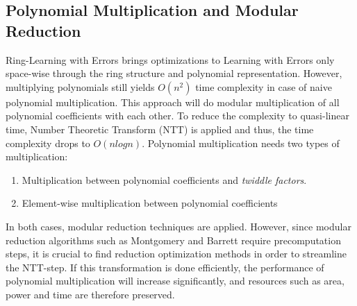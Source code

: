 \documentclass[11pt,
  titlepage=false,
  abstract=on,
]{scrreprt}
\begin{document}
\subsection{Polynomial Multiplication and Modular Reduction}
Ring-Learning with Errors brings optimizations to Learning with Errors only space-wise through the ring structure and polynomial representation.
However, multiplying polynomials still yields $O(n^{2})$ time complexity in case of naive polynomial multiplication. This approach will do modular
multiplication of all polynomial coefficients with each other.
To reduce the complexity to quasi-linear time, Number Theoretic Transform (NTT) is applied and thus, the time complexity drops to $O(nlogn)$.
Polynomial multiplication needs two types of multiplication:
\begin{enumerate}
  \item Multiplication between polynomial coefficients and \textit{twiddle factors}.
  \item Element-wise multiplication between polynomial coefficients
\end{enumerate}
In both cases, modular reduction techniques are applied. However, since modular reduction algorithms such as Montgomery and Barrett require precomputation steps, it is crucial to find reduction optimization methods
in order to streamline the NTT-step. If this transformation is done efficiently, the performance of polynomial multiplication will increase significantly, and resources such as area, power and time are therefore preserved.
\end{document}

